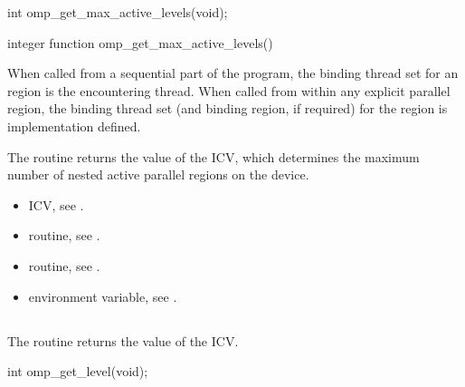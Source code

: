 \format
\begin{ccppspecific}
\begin{ompcFunction}
int omp_get_max_active_levels(void);
\end{ompcFunction}
\end{ccppspecific}

\begin{fortranspecific}
\begin{ompfFunction}
integer function omp_get_max_active_levels()
\end{ompfFunction}
\end{fortranspecific}

\binding
When called from a sequential part of the program, the binding thread 
set for an  region is the encountering 
thread. When called from within any explicit parallel region, the binding 
thread set (and binding region, if required) for the 
 region is implementation defined.

\effect
The  routine returns the value of the 
 ICV, which determines the maximum number of 
nested active parallel regions on the device.

\crossreferences
\begin{itemize}
\item {} ICV, see
.

\item {} routine, see
.

\item {} routine, see
.

\item {} environment variable, see
.
\end{itemize}



\subsection{}
\label{subsec:omp_get_level}
\summary
The  routine returns the value of the  ICV.

\format
\begin{ccppspecific}
\begin{ompcFunction}
int omp_get_level(void);
\end{ompcFunction}
\end{ccppspecific}

